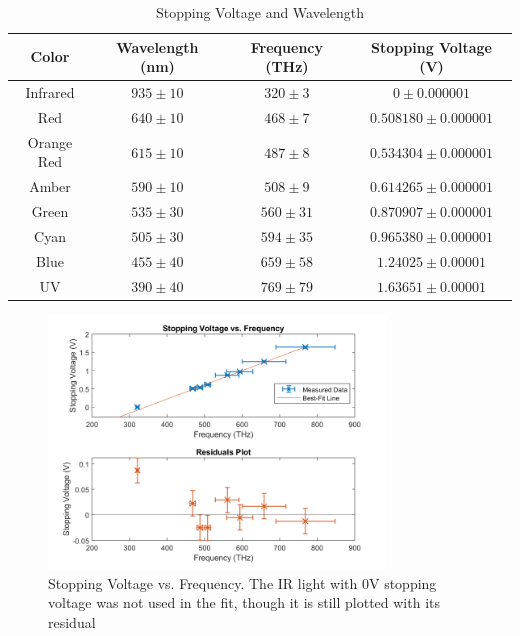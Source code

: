 \begin{table}[H]
\centering
\caption{Stopping Voltage and Wavelength}
\label{tab:results1}
\begin{tabular}{|c|c|c|c|}
\hline
Color & Wavelength (nm) & Frequency (THz) & Stopping Voltage (V) \\ \hline
Infrared & $935\pm10$ & $320\pm3$ & $0\pm0.000001$ \\ \hline
Red & $640\pm10$ & $468\pm7$ & $0.508180 \pm 0.000001$ \\ \hline
Orange Red & $615\pm10$ & $487\pm8$ & $0.534304 \pm 0.000001$ \\ \hline
Amber & $590\pm10$ & $508\pm9$ & $0.614265 \pm 0.000001$ \\ \hline
Green & $535\pm30$ & $560\pm31$ & $0.870907 \pm 0.000001$ \\ \hline
Cyan & $505\pm30$ & $594\pm35$ & $0.965380 \pm 0.000001$ \\ \hline
Blue & $455\pm40$ & $659\pm58$ & $1.24025 \pm 0.00001$ \\ \hline
UV & $390\pm40$ & $769\pm79$ & $1.63651 \pm 0.00001$ \\ \hline
\end{tabular}
\end{table}
\begin{figure} 
    \centering
    \includegraphics[width=0.8\textwidth]{Results/Frequency_vs_Stopping_Voltage.png}
    \caption{Stopping Voltage vs. Frequency. The IR light with 0V stopping voltage was not used in the fit, though it is still plotted with its residual}
    \label{fig:frequency_vs_voltage}
\end{figure}

